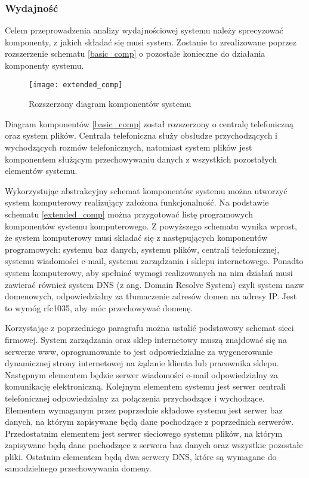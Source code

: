 			\subsubsection{Wydajność}
			\par Celem przeprowadzenia analizy wydajnościowej systemu należy sprecyzować komponenty, z jakich składać się musi system. Zostanie to zrealizowane poprzez rozszerzenie schematu \ref{basic_comp} o pozostałe konieczne do działania komponenty systemu.
		
			\begin{figure}[H]
				\centering
				\texttt{[image: extended\_comp]}
				\caption{Rozszerzony diagram komponentów systemu}
			\end{figure}
		
			Diagram komponentów \ref{basic_comp} został rozszerzony o centralę telefoniczną oraz system plików. Centrala telefoniczna służy obsłudze przychodzących i wychodzących rozmów telefonicznych, natomiast system plików jest komponentem służącym przechowywaniu danych z wszystkich pozostałych elementów systemu. 
		
			\par Wykorzystując abstrakcyjny schemat komponentów systemu można utworzyć system komputerowy realizujący założona funkcjonalność. Na podstawie schematu \ref{extended_comp} można przygotować listę programowych komponentów systemu komputerowego. Z powyższego schematu wynika wprost, że system komputerowy musi składać się z następujących komponentów programowych: systemu baz danych, systemu plików, centrali telefonicznej, systemu wiadomości e-mail, systemu zarządzania i sklepu internetowego. Ponadto system komputerowy, aby spełniać wymogi realizowanych na nim działań musi zawierać również system DNS (z ang. Domain Resolve System) czyli system nazw domenowych, odpowiedzialny za tłumaczenie adresów domen na adresy IP. Jest to wymóg rfc1035, aby móc przechowywać domenę. 
			
			\par Korzystając z poprzedniego paragrafu można ustalić podstawowy schemat sieci firmowej. System zarządzania oraz sklep internetowy muszą znajdować się na serwerze www, oprogramowanie to jest odpowiedzialne za wygenerowanie dynamicznej strony internetowej na żądanie klienta lub pracownika sklepu. Następnym elementem będzie serwer wiadomości e-mail odpowiedzialny za komunikację elektroniczną. Kolejnym elementem systemu jest serwer centrali telefonicznej odpowiedzialny za połączenia przychodzące i wychodzące. Elementem wymaganym przez poprzednie składowe systemu jest serwer baz danych, na którym zapisywane będą dane pochodzące z poprzednich serwerów. Przedostatnim elementem jest serwer sieciowego systemu plików, na którym zapisywane będą dane pochodzące z serwera baz danych oraz wszystkie pozostałe pliki. Ostatnim elementem będą dwa serwery DNS, które są wymagane do samodzielnego przechowywania domeny.
			
